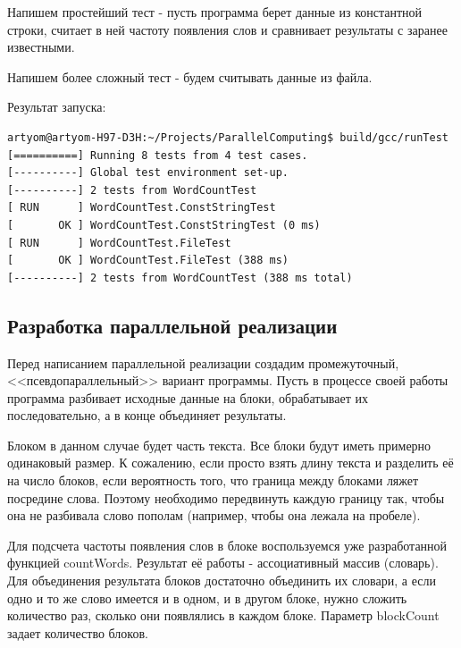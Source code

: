 Напишем простейший тест - пусть программа берет данные из константной строки, считает в ней частоту появления слов и сравнивает результаты с заранее известными.



Напишем более сложный тест - будем считывать данные из файла.



Результат запуска:
\begin{lstlisting}
artyom@artyom-H97-D3H:~/Projects/ParallelComputing$ build/gcc/runTest 
[==========] Running 8 tests from 4 test cases.
[----------] Global test environment set-up.
[----------] 2 tests from WordCountTest
[ RUN      ] WordCountTest.ConstStringTest
[       OK ] WordCountTest.ConstStringTest (0 ms)
[ RUN      ] WordCountTest.FileTest
[       OK ] WordCountTest.FileTest (388 ms)
[----------] 2 tests from WordCountTest (388 ms total)
\end{lstlisting}

\subsection{Разработка параллельной реализации}

Перед написанием параллельной реализации создадим промежуточный, <<псевдопараллельный>> вариант программы. Пусть в процессе своей работы программа разбивает исходные данные на блоки, обрабатывает их последовательно, а в конце объединяет результаты.

Блоком в данном случае будет часть текста. Все блоки будут иметь примерно одинаковый размер. К сожалению, если просто взять длину текста и разделить её на число блоков, если вероятность того, что граница между блоками ляжет посредине слова. Поэтому необходимо передвинуть каждую границу так, чтобы она не разбивала слово пополам (например, чтобы она лежала на пробеле).

Для подсчета частоты появления слов в блоке воспользуемся уже разработанной функцией countWords. Результат её работы - ассоциативный массив (словарь). Для объединения результата блоков достаточно объединить их словари, а если одно и то же слово имеется и в одном, и в другом блоке, нужно сложить количество раз, сколько они появлялись в каждом блоке. Параметр blockCount задает количество блоков.



